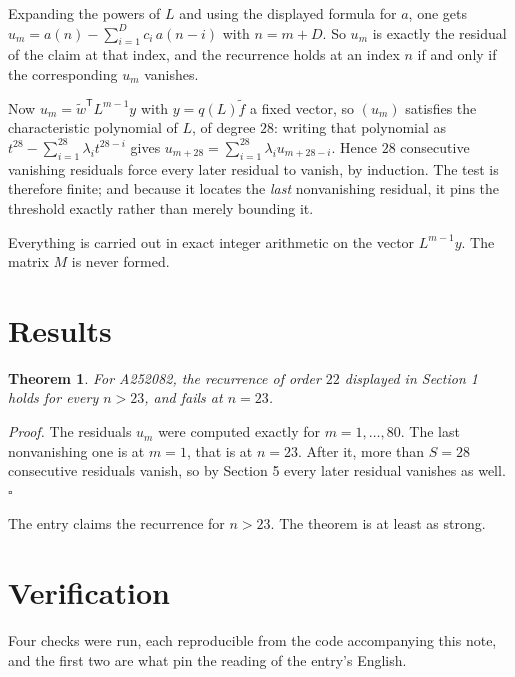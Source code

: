 \documentclass[11pt]{article}
\newtheorem{theorem}{Theorem}
\theoremstyle{definition}
\begin{document}
Expanding the powers of $L$ and using the displayed formula for $a$, one gets $u_m = a(n) - \sum_{i=1}^{D} c_i\,a(n-i)$ with $n = m + D$. So $u_m$ is exactly the residual of the claim at that index, and the recurrence holds at an index $n$ if and only if the corresponding $u_m$ vanishes.

Now $u_m = \tilde w^{\mathsf T} L^{m-1} y$ with $y = q(L)\tilde f$ a fixed vector, so $(u_m)$ satisfies the characteristic polynomial of $L$, of degree $28$: writing that polynomial as $t^{28} - \sum_{i=1}^{28} \lambda_i t^{28-i}$ gives $u_{m+28} = \sum_{i=1}^{28} \lambda_i u_{m+28-i}$. Hence $28$ consecutive vanishing residuals force every later residual to vanish, by induction. The test is therefore finite; and because it locates the {\itshape last} nonvanishing residual, it pins the threshold exactly rather than merely bounding it.

Everything is carried out in exact integer arithmetic on the vector $L^{m-1}y$. The matrix $M$ is never formed.

\section{Results}

\begin{theorem} For A252082, the recurrence of order $22$ displayed in Section 1 holds for every $n > 23$, and fails at $n = 23$.\end{theorem}

{\itshape Proof.} The residuals $u_m$ were computed exactly for $m = 1,\dots,80$. The last nonvanishing one is at $m = 1$, that is at $n = 23$. After it, more than $S = 28$ consecutive residuals vanish, so by Section 5 every later residual vanishes as well. $\square$

The entry claims the recurrence for $n > 23$. The theorem is at least as strong.

\section{Verification}

Four checks were run, each reproducible from the code accompanying this note, and the first two are what pin the reading of the entry's English.
\end{document}
